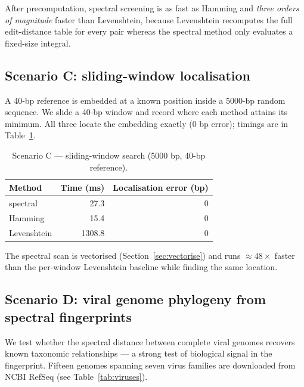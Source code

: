 \documentclass[12pt,a4paper]{article}
\begin{document}
After precomputation, spectral screening is as fast as Hamming and
\emph{three orders of magnitude} faster than Levenshtein, because
Levenshtein recomputes the full edit-distance table for every pair
whereas the spectral method only evaluates a fixed-size integral.

\subsection{Scenario C: sliding-window localisation}
\label{sec:bench-c}

A 40-bp reference is embedded at a known position inside a 5000-bp random
sequence. We slide a 40-bp window and record where each method attains
its minimum. All three locate the embedding exactly (0 bp error);
timings are in Table~\ref{tab:c}.

\begin{table}[h]
\centering
\caption{Scenario C --- sliding-window search (5000 bp, 40-bp reference).}
\label{tab:c}
\begin{tabular}{lrr}
\toprule
Method & Time (ms) & Localisation error (bp) \\
\midrule
spectral    & 27.3  & 0 \\
Hamming     & 15.4  & 0 \\
Levenshtein & 1308.8 & 0 \\
\bottomrule
\end{tabular}
\end{table}

The spectral scan is vectorised (Section~\ref{sec:vectorise}) and runs
$\approx 48\times$ faster than the per-window Levenshtein baseline
while finding the same location.

\subsection{Scenario D: viral genome phylogeny from spectral fingerprints}
\label{sec:bench-d}

We test whether the spectral distance between complete viral genomes
recovers known taxonomic relationships --- a strong test of biological
signal in the fingerprint.  Fifteen genomes spanning seven virus families
are downloaded from NCBI RefSeq (see Table~\ref{tab:viruses}).
\end{document}
